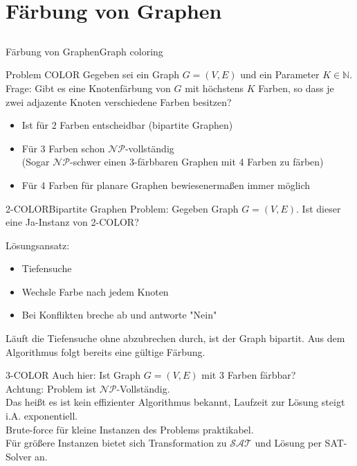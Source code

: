 \section{Färbung von Graphen}
\subsection{}
\begin{frame}{Färbung von Graphen}{Graph coloring}
	\begin{block}{Problem COLOR}
		Gegeben sei ein Graph $G = (V, E)$ und ein Parameter $K \in \mathbb{N}$.
		Frage: Gibt es eine Knotenfärbung von $G$ mit höchstens $K$ Farben, 
		so dass je zwei adjazente Knoten verschiedene Farben besitzen?
	\end{block}
	\begin{itemize}
		\item Ist für 2 Farben entscheidbar (bipartite Graphen)
		\item Für 3 Farben schon $\mathcal{NP}$-vollständig \\
			(Sogar $\mathcal{NP}$-schwer einen 3-färbbaren Graphen mit 4 Farben zu färben)
		\item Für 4 Farben für planare Graphen bewiesenermaßen immer möglich
	\end{itemize}
\end{frame}

\begin{frame}{2-COLOR}{Bipartite Graphen}
	Problem: Gegeben Graph $G=(V, E)$. Ist dieser eine Ja-Instanz von 2-COLOR?

	Lösungsansatz:
	\begin{itemize}
		\item Tiefensuche
		\item Wechsle Farbe nach jedem Knoten
		\item Bei Konflikten breche ab und antworte "Nein"
	\end{itemize}
	Läuft die Tiefensuche ohne abzubrechen durch, ist der Graph bipartit. Aus dem Algorithmus folgt bereits eine gültige Färbung.
\end{frame}

\begin{frame}{3-COLOR}
	Auch hier: Ist Graph $G = (V,E)$ mit 3 Farben färbbar? \\
	Achtung: Problem ist $\mathcal{NP}$-Vollständig.
	\\
	Das heißt es ist kein effizienter Algorithmus bekannt, Laufzeit zur Lösung steigt i.A. exponentiell. \\
	Brute-force für kleine Instanzen des Problems praktikabel. \\
	Für größere Instanzen bietet sich Transformation zu $\mathcal{SAT}$ und Lösung per SAT-Solver an.

\end{frame}

